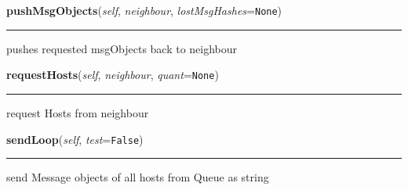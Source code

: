     \label{peer:Peer:pushMsgObjects}

    \vspace{0.5ex}

\hspace{.8\funcindent}\begin{boxedminipage}{\funcwidth}

    \raggedright \textbf{pushMsgObjects}(\textit{self}, \textit{neighbour}, \textit{lostMsgHashes}={\tt None})

    \vspace{-1.5ex}

    \rule{\textwidth}{0.5\fboxrule}
\setlength{\parskip}{2ex}
    pushes requested msgObjects back to neighbour

\setlength{\parskip}{1ex}
    \end{boxedminipage}

    \label{peer:Peer:requestHosts}

    \vspace{0.5ex}

\hspace{.8\funcindent}\begin{boxedminipage}{\funcwidth}

    \raggedright \textbf{requestHosts}(\textit{self}, \textit{neighbour}, \textit{quant}={\tt None})

    \vspace{-1.5ex}

    \rule{\textwidth}{0.5\fboxrule}
\setlength{\parskip}{2ex}
    request Hosts from neighbour

\setlength{\parskip}{1ex}
    \end{boxedminipage}

    \label{peer:Peer:sendLoop}

    \vspace{0.5ex}

\hspace{.8\funcindent}\begin{boxedminipage}{\funcwidth}

    \raggedright \textbf{sendLoop}(\textit{self}, \textit{test}={\tt False})

    \vspace{-1.5ex}

    \rule{\textwidth}{0.5\fboxrule}
\setlength{\parskip}{2ex}
    send Message objects of all hosts from Queue as string

\setlength{\parskip}{1ex}
    \end{boxedminipage}


